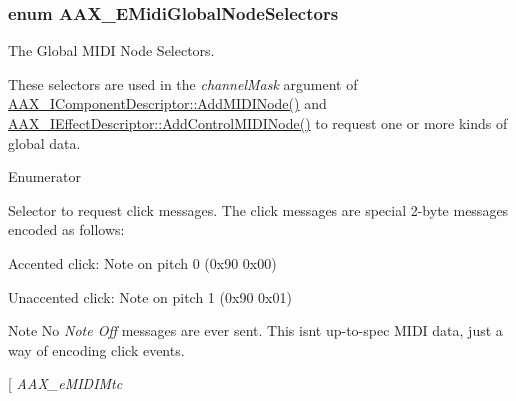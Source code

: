 \subsubsection[{A\+A\+X\+\_\+\+E\+Midi\+Global\+Node\+Selectors}]{\setlength{\rightskip}{0pt plus 5cm}enum {\bf A\+A\+X\+\_\+\+E\+Midi\+Global\+Node\+Selectors}}\label{a00206_a349dae6bc64bda67a5440cbc6637f92d}


The Global M\+I\+D\+I Node Selectors. 

These selectors are used in the {\itshape channel\+Mask} argument of \hyperlink{a00088_a6284dda9ccca898e33075de29dad4e39}{A\+A\+X\+\_\+\+I\+Component\+Descriptor\+::\+Add\+M\+I\+D\+I\+Node()} and \hyperlink{a00096_aa7709de005e0256feb522758ccc5b582}{A\+A\+X\+\_\+\+I\+Effect\+Descriptor\+::\+Add\+Control\+M\+I\+D\+I\+Node()} to request one or more kinds of global data. \begin{Desc}
\item[Enumerator]\par
\begin{description}
\item[{\em 
\hypertarget{a00206_a349dae6bc64bda67a5440cbc6637f92da07f7ef0ac806b94f96cc14e81678b84a}{}A\+A\+X\+\_\+e\+M\+I\+D\+I\+Click\label{a00206_a349dae6bc64bda67a5440cbc6637f92da07f7ef0ac806b94f96cc14e81678b84a}
}]Selector to request click messages. The click messages are special 2-\/byte messages encoded as follows\+: \begin{DoxyItemize}
\item Accented click\+: Note on pitch 0 ({\ttfamily 0x90 0x00}) \item Unaccented click\+: Note on pitch 1 ({\ttfamily 0x90 0x01}) \begin{DoxyNote}{Note}
No {\itshape  Note Off } messages are ever sent. This isn\textquotesingle{}t up-\/to-\/spec M\+I\+D\+I data, just a way of encoding click events. 
\end{DoxyNote}
\end{DoxyItemize}
\item[{\em 
\hypertarget{a00206_a349dae6bc64bda67a5440cbc6637f92da29d1a888ea18fe3f32c7231ceb964e61}{}A\+A\+X\+\_\+e\+M\+I\+D\+I\+Mtc\label{a00206_a349dae6bc64bda67a5440cbc6637f92da29d1a888ea18fe3f32c7231ceb964e61}
}
\end{description}
\end{Desc}
